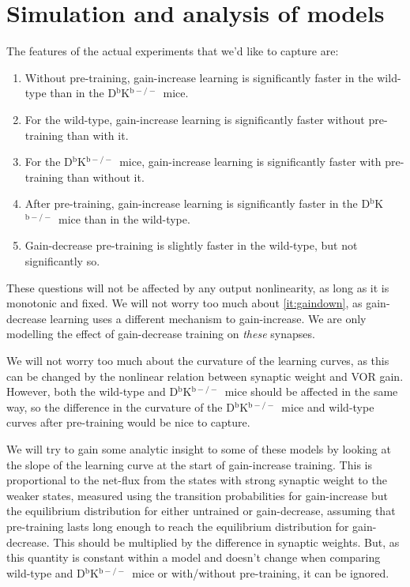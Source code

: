 \documentclass[12pt]{article}
\newcommand{\KO}{D$^\mathrm{b}$K$^{\mathrm{b}-/-}$}
\begin{document}
\section{Simulation and analysis of models}\label{sec:results}

The features of the actual experiments that we'd like to capture are:
\begin{enumerate}
  \item Without pre-training, gain-increase learning is significantly faster in the wild-type than in the \KO\ mice.
  \item For the wild-type, gain-increase learning is significantly faster without pre-training than with it.
  \item For the \KO\ mice, gain-increase learning is significantly faster with pre-training than without it.
  \item After pre-training, gain-increase learning is significantly faster in the \KO\ mice than in the wild-type.
  \item Gain-decrease pre-training is slightly faster in the wild-type, but not significantly so.\label{it:gaindown}
\end{enumerate}
These questions will not be affected by any output nonlinearity, as long as it is monotonic and fixed.
We will not worry too much about \autoref{it:gaindown}, as gain-decrease learning uses a different mechanism to gain-increase.
We are only modelling the effect of gain-decrease training on \emph{these} synapses.

We will not worry too much about the curvature of the learning curves, as this can be changed by the nonlinear relation between synaptic weight and VOR gain.
However, both the wild-type and \KO\ mice should be affected in the same way, so the difference in the curvature of the \KO\ mice and wild-type curves after pre-training would be nice to capture.

We will try to gain some analytic insight to some of these models by looking at the slope of the learning curve at the start of gain-increase training.
This is proportional to the net-flux from the states with strong synaptic weight to the weaker states, measured using the transition probabilities for gain-increase but the equilibrium distribution for either untrained or gain-decrease, assuming that pre-training lasts long enough to reach the equilibrium distribution for gain-decrease.
This should be multiplied by the difference in synaptic weights.
But, as this quantity is constant within a model and doesn't change when comparing wild-type and \KO\ mice or with/without pre-training, it can be ignored.
\end{document}

